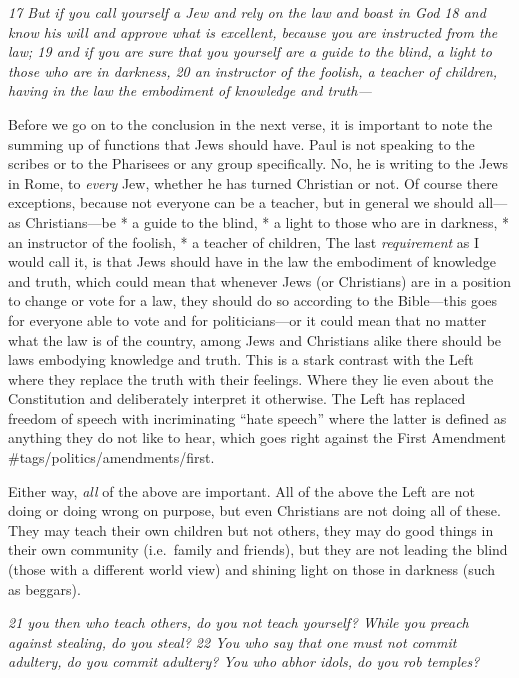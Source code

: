 \emph{17 But if you call yourself a Jew and rely on the law and boast in
God 18 and know his will and approve what is excellent, because you are
instructed from the law; 19 and if you are sure that you yourself are a
guide to the blind, a light to those who are in darkness, 20 an
instructor of the foolish, a teacher of children, having in the law the
embodiment of knowledge and truth---}

Before we go on to the conclusion in the next verse, it is important to
note the summing up of functions that Jews should have. Paul is not
speaking to the scribes or to the Pharisees or any group specifically.
No, he is writing to the Jews in Rome, to \emph{every} Jew, whether he
has turned Christian or not. Of course there exceptions, because not
everyone can be a teacher, but in general we should all---as
Christians---be * a guide to the blind, * a light to those who are in
darkness, * an instructor of the foolish, * a teacher of children, The
last \emph{requirement} as I would call it, is that Jews should have in
the law the embodiment of knowledge and truth, which could mean that
whenever Jews (or Christians) are in a position to change or vote for a
law, they should do so according to the Bible---this goes for everyone
able to vote and for politicians---or it could mean that no matter what
the law is of the country, among Jews and Christians alike there should
be laws embodying knowledge and truth. This is a stark contrast with the
Left where they replace the truth with their feelings. Where they lie
even about the Constitution and deliberately interpret it otherwise. The
Left has replaced freedom of speech with incriminating ``hate speech''
where the latter is defined as anything they do not like to hear, which
goes right against the First Amendment \#tags/politics/amendments/first.

Either way, \emph{all} of the above are important. All of the above the
Left are not doing or doing wrong on purpose, but even Christians are
not doing all of these. They may teach their own children but not
others, they may do good things in their own community (i.e.~family and
friends), but they are not leading the blind (those with a different
world view) and shining light on those in darkness (such as beggars).

\emph{21 you then who teach others, do you not teach yourself? While you
preach against stealing, do you steal? 22 You who say that one must not
commit adultery, do you commit adultery? You who abhor idols, do you rob
temples?}

